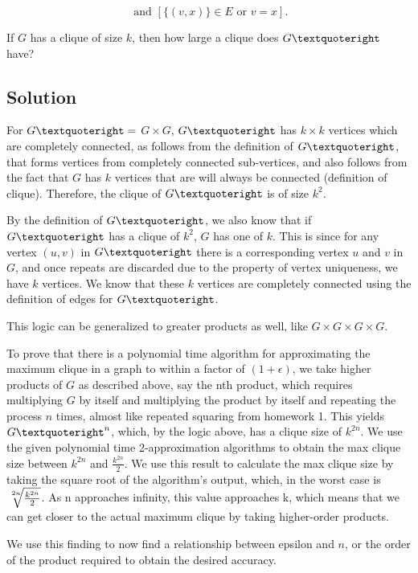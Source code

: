 \documentclass[11pt]{article}
\begin{document}
\begin{equation*}
[\{(u,w)\}\in E \text{ or } u=w] \text{ and } [\{(v,x)\}\in E \text{ or } v=x].			
\end{equation*}

If $G$ has a clique of size $k$, then how large a clique does $G\textquoteright$ have?

\subsection{Solution}
For $G\textquoteright = $ $G \times G$, $G\textquoteright$ has $k \times k$ vertices which are completely connected, as follows from the definition of $G\textquoteright$, that forms vertices from completely connected sub-vertices, and also follows from the fact that $G$ has $k$ vertices that are will always be connected (definition of clique). Therefore, the clique of $G\textquoteright$ is of size $k^2$.

By the definition of $G\textquoteright$, we also know that if $G\textquoteright$ has a clique of $k^2$, $G$ has one of $k$. This is since for any vertex $(u, v)$ in $G\textquoteright$ there is a corresponding vertex $u$ and $v$ in $G$, and once repeats are discarded due to the property of vertex uniqueness, we have $k$ vertices. We know that these $k$ vertices are completely connected using the definition of edges for $G\textquoteright$.

This logic can be generalized to greater products as well, like $G \times G \times G \times G$.

To prove that there is a polynomial time algorithm for approximating the maximum clique in a graph to within a factor of $(1 + \epsilon)$, we take higher products of $G$ as described above, say the nth product, which requires multiplying $G$ by itself and multiplying the product by itself and repeating the process $n$ times, almost like repeated squaring from homework 1. This yields $G\textquoteright^n$, which, by the logic above, has a clique size of $k^{2n}$. We use the given polynomial time 2-approximation algorithms to obtain the max clique size between $k^{2n}$ and $\frac{k^{2n}}{2}$. We use this result to calculate the max clique size by taking the square root of the algorithm's output, which, in the worst case is $\sqrt[\leftroot{-3}\uproot{3}2n]{\frac{k^{2n}}{2}}$. As n approaches infinity, this value approaches k, which means that we can get closer to the actual maximum clique by taking higher-order products. 

We use this finding to now find a relationship between epsilon and $n$, or the order of the product required to obtain the desired accuracy.
\end{document}
